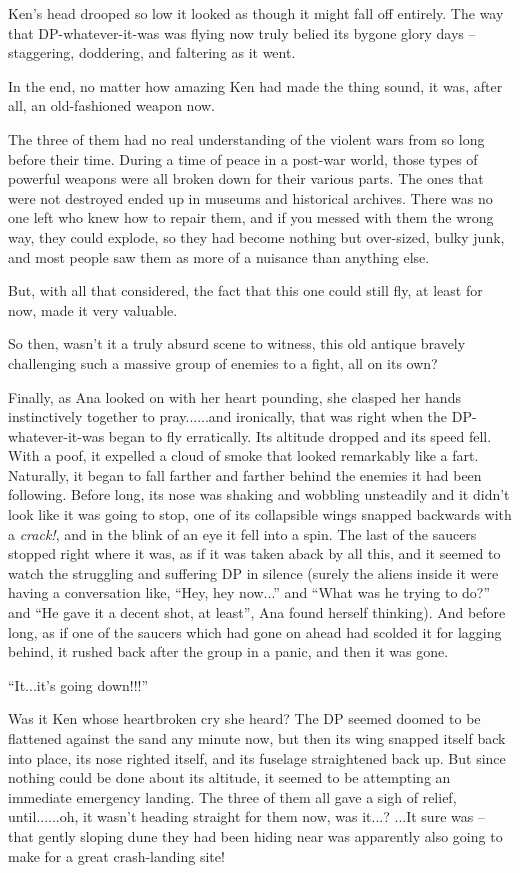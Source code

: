 \documentclass[
]{article}
\begin{document}
Ken's head drooped so low it looked as though it might fall off
entirely. The way that DP-whatever-it-was was flying now truly belied
its bygone glory days -- staggering, doddering, and faltering as it
went.

In the end, no matter how amazing Ken had made the thing sound, it was,
after all, an old-fashioned weapon now.

The three of them had no real understanding of the violent wars from so
long before their time. During a time of peace in a post-war world,
those types of powerful weapons were all broken down for their various
parts. The ones that were not destroyed ended up in museums and
historical archives. There was no one left who knew how to repair them,
and if you messed with them the wrong way, they could explode, so they
had become nothing but over-sized, bulky junk, and most people saw them
as more of a nuisance than anything else.

But, with all that considered, the fact that this one could still fly,
at least for now, made it very valuable.

So then, wasn't it a truly absurd scene to witness, this old antique
bravely challenging such a massive group of enemies to a fight, all on
its own?

Finally, as Ana looked on with her heart pounding, she clasped her hands
instinctively together to pray......and ironically, that was right when
the DP-whatever-it-was began to fly erratically. Its altitude dropped
and its speed fell. With a poof, it expelled a cloud of smoke that
looked remarkably like a fart. Naturally, it began to fall farther and
farther behind the enemies it had been following. Before long, its nose
was shaking and wobbling unsteadily and it didn't look like it was going
to stop, one of its collapsible wings snapped backwards with a
\emph{crack!}, and in the blink of an eye it fell into a spin. The last
of the saucers stopped right where it was, as if it was taken aback by
all this, and it seemed to watch the struggling and suffering DP in
silence (surely the aliens inside it were having a conversation like,
``Hey, hey now...'' and ``What was he trying to do?'' and ``He gave it a
decent shot, at least'', Ana found herself thinking). And before long,
as if one of the saucers which had gone on ahead had scolded it for
lagging behind, it rushed back after the group in a panic, and then it
was gone.

``It...it's going down!!!''

Was it Ken whose heartbroken cry she heard? The DP seemed doomed to be
flattened against the sand any minute now, but then its wing snapped
itself back into place, its nose righted itself, and its fuselage
straightened back up. But since nothing could be done about its
altitude, it seemed to be attempting an immediate emergency landing. The
three of them all gave a sigh of relief, until......oh, it wasn't
heading straight for them now, was it...? ...It sure was -- that gently
sloping dune they had been hiding near was apparently also going to make
for a great crash-landing site!
\end{document}
